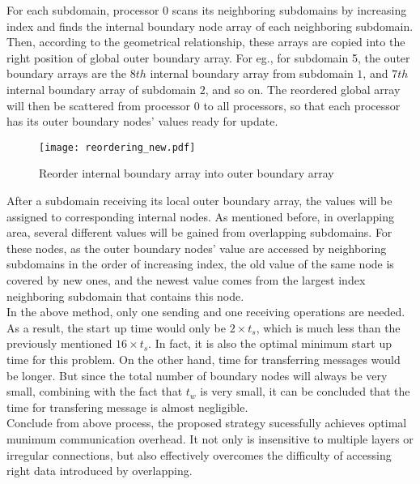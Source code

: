 \documentclass{sig-alternate}
\begin{document}
	For each subdomain, processor 0 scans its neighboring subdomains by increasing index and finds the internal boundary 
	node array of each neighboring subdomain. Then, according to the geometrical relationship,
	these arrays are copied into the right position of global outer boundary array. For eg., for subdomain 5, the outer boundary
	arrays are the $8th$ internal boundary array from subdomain $1$, and $7th$ internal boundary array of subdomain $2$, and so on. 
	The reordered global array will then be scattered from processor 0 to all processors, so that each processor has its outer 
	boundary nodes' values ready for update.\\ 
	\begin{figure}[htbp]
	  \centering
	  \texttt{[image: reordering\_new.pdf]}
	  \caption{Reorder internal boundary array into outer boundary array}
	  \label{Fig4}
	\end{figure}

	After a subdomain receiving its local outer boundary array, the values will be assigned to corresponding internal nodes. As 
	mentioned before, in overlapping area, several different values will be gained from overlapping subdomains. For these nodes, 
	as the outer boundary nodes' value are accessed by neighboring subdomains 
	in the order of increasing index, the old value of the same node is covered by new ones, and the newest value
	comes from the largest index neighboring subdomain that contains this node.\\  
	
	In the above method, only one sending and one receiving operations are needed. As a result, the start up time would only be 
	$2\times t_s$, which is much less than the previously mentioned $16\times t_s$. In fact, it is also the optimal minimum 
	start up time for this problem. On the other hand, time for transferring messages would be longer. But since the total number 
	of boundary nodes will always be very small, combining with the fact that $t_w$ is very small, it can be concluded that the 
	time for transfering message is almost negligible.\\ 

	Conclude from above process, the proposed strategy sucessfully achieves optimal munimum communication overhead. It  
	not only is insensitive to multiple layers or irregular connections, but also effectively overcomes the difficulty of 
	accessing right data introduced by overlapping.\\
	
\end{document}
